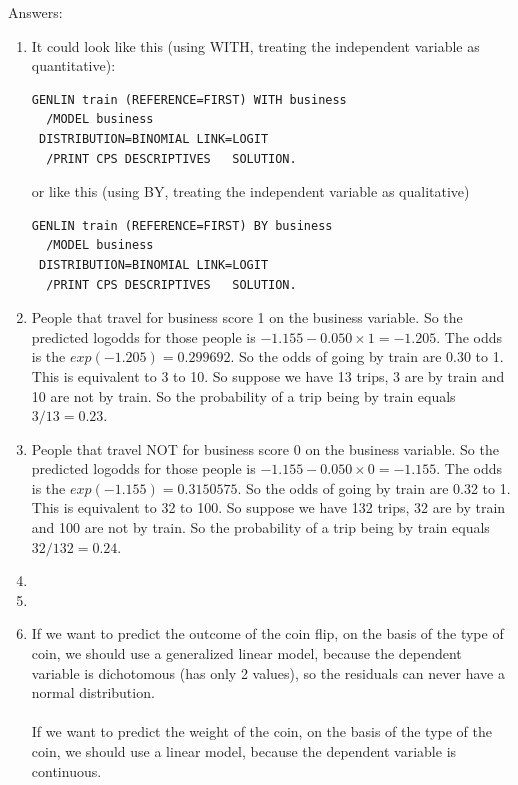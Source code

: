 \documentclass[]{report}\usepackage[]{graphicx}\usepackage[]{color}
\begin{document}
Answers:
\begin{enumerate}


\item
It could look like this (using WITH, treating the independent variable as quantitative):

\begin{verbatim}
GENLIN train (REFERENCE=FIRST) WITH business
  /MODEL business
 DISTRIBUTION=BINOMIAL LINK=LOGIT
  /PRINT CPS DESCRIPTIVES   SOLUTION.
\end{verbatim}


or like this (using BY, treating the independent variable as qualitative)

\begin{verbatim}
GENLIN train (REFERENCE=FIRST) BY business
  /MODEL business
 DISTRIBUTION=BINOMIAL LINK=LOGIT
  /PRINT CPS DESCRIPTIVES   SOLUTION.
\end{verbatim}


\item
People that travel for business score 1 on the business variable. So the predicted logodds for those people is $-1.155 - 0.050 \times 1 = -1.205$. The odds is the $exp(-1.205)=0.299692 $. So the odds of going by train are 0.30 to 1. This is equivalent to 3 to 10. So suppose we have 13 trips, 3 are by train and 10 are not by train. So the probability of a trip being by train equals $3/13=0.23$.

\item
People that travel NOT for business score 0 on the business variable. So the predicted logodds for those people is $-1.155 - 0.050 \times 0 = -1.155$. The odds is the $exp(-1.155)=0.3150575 $. So the odds of going by train are 0.32 to 1. This is equivalent to 32 to 100. So suppose we have 132 trips, 32 are by train and 100 are not by train. So the probability of a trip being by train equals $32/132=0.24$.

\item


\item

\item


If we want to predict the outcome of the coin flip, on the basis of the type of coin, we should use a generalized linear model, because the dependent variable is dichotomous (has only 2 values), so the residuals can never have a normal distribution.
\\
\\
If we want to predict the weight of the coin, on the basis of the type of the coin, we should use a linear model, because the dependent variable is continuous.


\end{enumerate}
\end{document}
